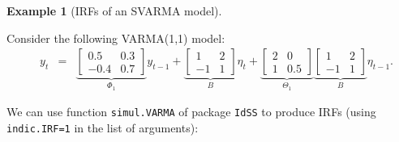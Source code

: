 \documentclass[
  12pt,
]{book}
\theoremstyle{definition}
\theoremstyle{definition}
\newtheorem{example}{Example}[chapter]
\theoremstyle{definition}
\theoremstyle{definition}
\theoremstyle{remark}
\begin{document}
\begin{example}[IRFs of an SVARMA model]
\protect\hypertarget{exm:IRFVARMA}{}\label{exm:IRFVARMA}

Consider the following VARMA(1,1) model:
\begin{eqnarray}
\quad y_t &=&
\underbrace{\left[\begin{array}{cc}
0.5 & 0.3 \\
-0.4 & 0.7
\end{array}\right]}_{\Phi_1}
y_{t-1} +  
\underbrace{\left[\begin{array}{cc}
1 & 2 \\
-1 & 1
\end{array}\right]}_{B}\eta_t + \underbrace{\left[\begin{array}{cc}
2 & 0 \\
1 & 0.5
\end{array}\right]}_{\Theta_1} \underbrace{\left[\begin{array}{cc}
1 & 2 \\
-1 & 1
\end{array}\right]}_{B}\eta_{t-1}.\label{eq:VARMA111}
\end{eqnarray}

We can use function \texttt{simul.VARMA} of package \texttt{IdSS} to produce IRFs (using \texttt{indic.IRF=1} in the list of arguments):


\end{example}
\end{document}

